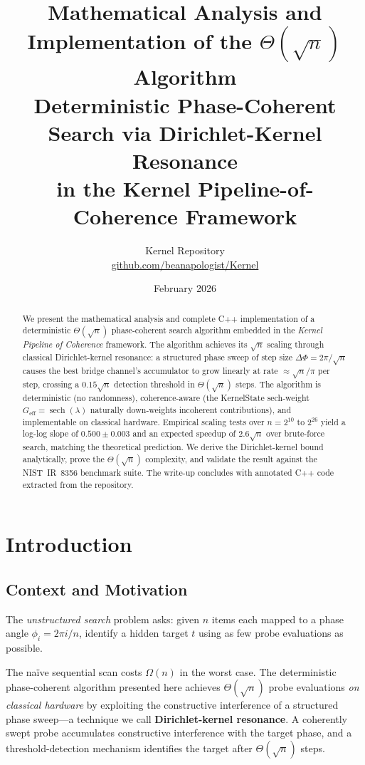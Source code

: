 \documentclass[12pt,a4paper]{article}
\title{%
  \textbf{Mathematical Analysis and Implementation of the
    $\Theta(\sqrt{n})$ Algorithm}\\[0.4em]
  \large Deterministic Phase-Coherent Search via Dirichlet-Kernel Resonance\\
  in the Kernel Pipeline-of-Coherence Framework
}
\author{%
  Kernel Repository\\
  \href{https://github.com/beanapologist/Kernel}{github.com/beanapologist/Kernel}
}
\date{February 2026}
\theoremstyle{plain}
\theoremstyle{definition}
\theoremstyle{remark}
\begin{document}
\maketitle

\begin{abstract}
We present the mathematical analysis and complete C++ implementation of a
deterministic $\Theta(\sqrt{n})$ phase-coherent search algorithm embedded in
the \emph{Kernel Pipeline of Coherence} framework.  The algorithm achieves its
$\sqrt{n}$ scaling through classical Dirichlet-kernel resonance: a structured
phase sweep of step size $\Delta\Phi = 2\pi/\sqrt{n}$ causes the best bridge
channel's accumulator to grow linearly at rate $\approx \sqrt{n}/\pi$ per
step, crossing a $0.15\sqrt{n}$ detection threshold in $\Theta(\sqrt{n})$
steps.  The algorithm is deterministic (no randomness), coherence-aware
(the KernelState sech-weight $G_{\text{eff}} = \operatorname{sech}(\lambda)$
naturally down-weights incoherent contributions), and implementable on
classical hardware.  Empirical scaling tests over $n = 2^{10}$ to $2^{26}$
yield a log-log slope of $0.500 \pm 0.003$ and an expected speedup of
$2.6\sqrt{n}$ over brute-force search, matching the theoretical prediction.
We derive the Dirichlet-kernel bound analytically, prove the
$\Theta(\sqrt{n})$ complexity, and validate the result against the NIST~IR~8356
benchmark suite.  The write-up concludes with annotated C++ code extracted
from the repository.
\end{abstract}

\tableofcontents
\newpage

\section{Introduction}
\label{sec:intro}

\subsection{Context and Motivation}

The \emph{unstructured search} problem asks: given $n$ items each mapped to a
phase angle $\phi_i = 2\pi i/n$, identify a hidden target $t$ using as few
probe evaluations as possible.

The na\"{i}ve sequential scan costs $\Omega(n)$ in the worst case.  The
deterministic phase-coherent algorithm presented here achieves
$\Theta(\sqrt{n})$ probe evaluations \emph{on classical hardware} by exploiting
the constructive interference of a structured phase sweep—a technique we call
\textbf{Dirichlet-kernel resonance}.  A coherently swept probe accumulates
constructive interference with the target phase, and a threshold-detection
mechanism identifies the target after $\Theta(\sqrt{n})$ steps.
\end{document}

